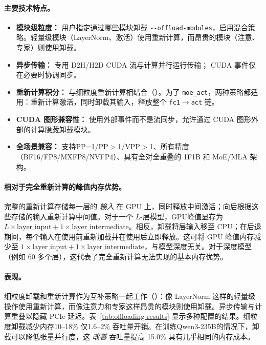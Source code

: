 \paragraph{主要技术特点。}
\begin{itemize}[itemsep=2pt,topsep=4pt]
    \item \textbf{模块级粒度：} 用户指定通过哪些模块卸载 \verb|--offload-modules|，启用混合策略。轻量级模块（LayerNorm、激活）使用重新计算，而昂贵的模块（注意、专家）则使用卸载。
    \item \textbf{异步传输：} 专用 D2H/H2D CUDA 流与计算并行运行传输； CUDA 事件仅在必要时协调同步。
    \item \textbf{重新计算积分：} 与细粒度重新计算相结合（）。为了 \texttt{moe\_act}，两种策略都适用：重新计算激活，同时卸载其输入，释放整个 \texttt{fc1}$\rightarrow$\texttt{act} 链。
    \item \textbf{CUDA 图形兼容性：} 使用外部事件而不是流同步，允许通过 CUDA 图形外部的计算隐藏卸载模块。
    \item \textbf{全场景兼容：} 支持PP=1/PP$>$1/VPP$>$1、所有精度（BF16/FP8/MXFP8/NVFP4）、具有全对全重叠的 1F1B 和 MoE/MLA 架构。
\end{itemize}

\paragraph{相对于完全重新计算的峰值内存优势。}
完整的重新计算存储每一层的 \textit{输入} 在 GPU 上，同时释放中间激活；向后根据这些存储的输入重新计算中间值。对于一个 $L$-层模型，GPU峰值显存为 $L \times \text{layer\_input} + 1 \times \text{layer\_intermediate}$。相反，卸载将层输入移至 CPU；在后退期间，每个输入在使用前重新加载并在使用后立即释放。这可将 GPU 峰值内存减少至 $1 \times \text{layer\_input} + 1 \times \text{layer\_intermediate}$，与模型深度无关。对于深度模型（例如 60 多个层），这代表了完全重新计算无法实现的基本内存优势。

\paragraph{表现。}
细粒度卸载和重新计算作为互补策略一起工作（）：像 LayerNorm 这样的轻量级操作使用重新计算，而像注意力和专家这样昂贵的模块则使用卸载。异步传输与计算重叠以隐藏 PCIe 延迟。表~\ref{tab:offloading-results} 显示多种配置的结果。细粒度卸载减少内存10--18\% 仅1.6--2\% 吞吐量开销。在训练Qwen3-235B的情况下，卸载可以降低张量并行度，这 \textit{改善} 吞吐量提高 15.0\% 具有几乎相同的内存成本。

